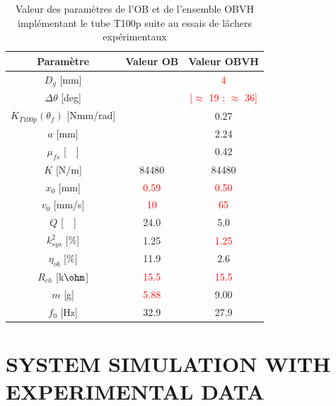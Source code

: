 \documentclass[3p,twocolumn,preprint]{elsarticle}
\begin{document}
\begin{table}[!htbp]
	\centering
		\begin{tabular}[t]{c|c|c}
\toprule
\multicolumn{1}{c}{\textbf{Paramètre}}	&
\multicolumn{1}{c}{\textbf{Valeur OB}} 	& 
\multicolumn{1}{c}{\textbf{Valeur OBVH}}  \\
\midrule
$D_g$ [mm] 						& \cellcolor{ashgrey} 		& \textcolor{red}{4} 		\\ \hline
$\Delta\theta$ [deg] 			& \cellcolor{ashgrey} 		& \textcolor{red}{{[$\approx$ 19 ; $\approx$ 36]}} \\ \hline
$K_{T100p}(\theta_f)$ [Nmm/rad] & \cellcolor{ashgrey}  		&  0.27 					\\ \hline
$a$ [mm]         			    & \cellcolor{ashgrey}  		&  2.24				 	 	\\ \hline
$\mu_{fs}$ [~~] 				& \cellcolor{ashgrey}  		&  0.42  					\\ \hline
$K$ [N/m] 						&	84480			  	 	&  84480  					\\ \hline
$x_0$ [mm] 						& \textcolor{red}{0.59}		& \textcolor{red}{0.50}  	\\ \hline
$v_0$ [mm/s] 					& \textcolor{red}{10}		& \textcolor{red}{65}  		\\ \hline
$Q$	[~~] 						& 		24.0		 		& 5.0     					\\ \hline
$k^2_{sys}$ [\%] 				& 		1.25		 		& \textcolor{red}{1.25}   	\\ \hline
$\eta_{ob}$ [\%] 				& 		11.9		 		& 2.6   					\\ \hline	
$R_{ch}$ [k$\text{\ohm}$] 		&	\textcolor{red}{15.5}	& \textcolor{red}{15.5}    	\\ \hline		
$m$	[g]						    &	\textcolor{red}{5.88}	& 9.00   					\\ \hline	
$f_0$ [Hz]						&		32.9				& 27.9   					\\
\bottomrule	
	\end{tabular}
        \caption{Valeur des paramètres de l'OB et de l'ensemble OBVH implémentant le tube T100p suite au essais de lâchers expérimentaux}
        \label{tab:parametres lacher tube}
\end{table}        

\section{SYSTEM SIMULATION WITH EXPERIMENTAL DATA}
\end{document}
